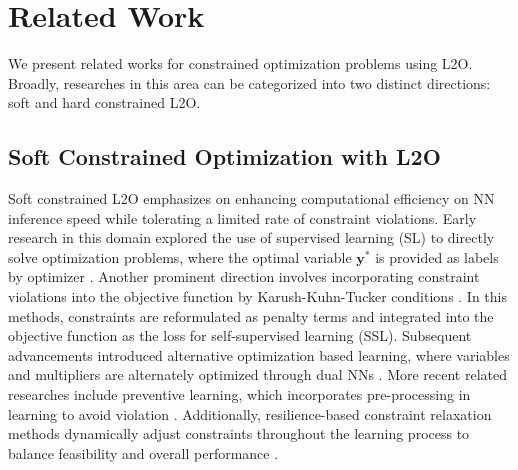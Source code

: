 \section{Related Work}
We present related works for constrained optimization problems using L2O. Broadly, researches in this area can be categorized into two distinct directions: soft and hard constrained L2O. 


\subsection{Soft Constrained Optimization with L2O}
Soft constrained L2O emphasizes on enhancing computational efficiency on NN inference speed while tolerating a limited rate of constraint violations. Early research in this domain explored the use of supervised learning (SL) to directly solve optimization problems, where the optimal variable $\mathbf{y}^*$ is provided as labels by optimizer \cite{zamzam2020learning,guha2019machine}.  Another prominent direction involves incorporating constraint violations into the objective function by Karush-Kuhn-Tucker conditions \cite{donti2021dc3,zhang2024constrained, xu2018semantic}. In this methods, constraints are reformulated as penalty terms and integrated into the objective function as the loss for self-supervised learning (SSL). Subsequent advancements introduced alternative optimization based learning, where variables and multipliers are alternately optimized through dual NNs \cite{park2023self,kim2023self,nandwani2019primal}. More recent related researches include preventive learning, which incorporates pre-processing in learning to avoid violation \cite{zhao2023ensuring}. Additionally, resilience-based constraint relaxation methods dynamically adjust constraints throughout the learning process to balance feasibility and overall performance \cite{hounie2024resilient,ding2024resilient}.





